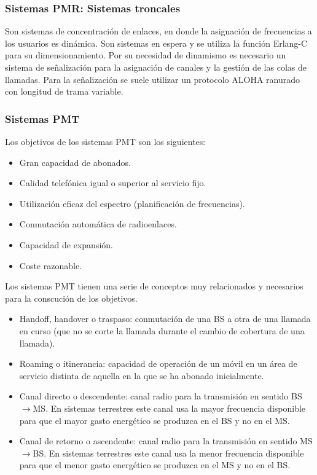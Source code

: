 \subsubsection{Sistemas \acrshort{PMR}: Sistemas troncales}
\label{ssub:troncales}
	Son sistemas de concentración de enlaces, en donde la asignación de frecuencias a los usuarios es dinámica. Son sistemas en espera y se utiliza la función Erlang-C para su dimensionamiento. Por su necesidad de dinamismo es necesario un sistema de señalización para la asignación de canales y la gestión de las colas de llamadas. Para la señalización se suele utilizar un protocolo ALOHA ranurado con longitud de trama variable.\\	
\subsubsection{Sistemas \acrshort{PMT}}
\label{ssub:PMT}
	Los objetivos de los sistemas \acrshort{PMT} son los siguientes:
\begin{itemize}
	\item Gran capacidad de abonados.
	\item Calidad telefónica igual o superior al servicio fijo.
	\item Utilización eficaz del espectro (planificación de frecuencias).
	\item Conmutación automática de radioenlaces.
	\item Capacidad de expansión.
	\item Coste razonable.
\end{itemize}
Los sistemas \acrshort{PMT} tienen una serie de conceptos muy relacionados y necesarios para la conscución de los objetivos.
\begin{itemize}
	\item Handoff, handover o traspaso: conmutación de una \acrshort{BS} a otra de una llamada en curso (que no se corte la llamada durante el cambio de cobertura de una llamada).
	\item Roaming o itinerancia: capacidad de operación de un móvil en un área de servicio distinta de aquella en la que se ha abonado inicialmente.
	\item Canal directo o descendente: canal radio para la transmisión en sentido \acrshort{BS}$\to$\acrshort{MS}. En sistemas terrestres este canal usa la mayor frecuencia disponible para que el mayor gasto energético se produzca en el \acrshort{BS} y no en el \acrshort{MS}.
	\item Canal de retorno o ascendente: canal radio para la transmisión en sentido \acrshort{MS}$\to$\acrshort{BS}. En sistemas terrestres este canal usa la menor frecuencia disponible para que el menor gasto energético se produzca en el \acrshort{MS} y no en el \acrshort{BS}.
\end{itemize}
